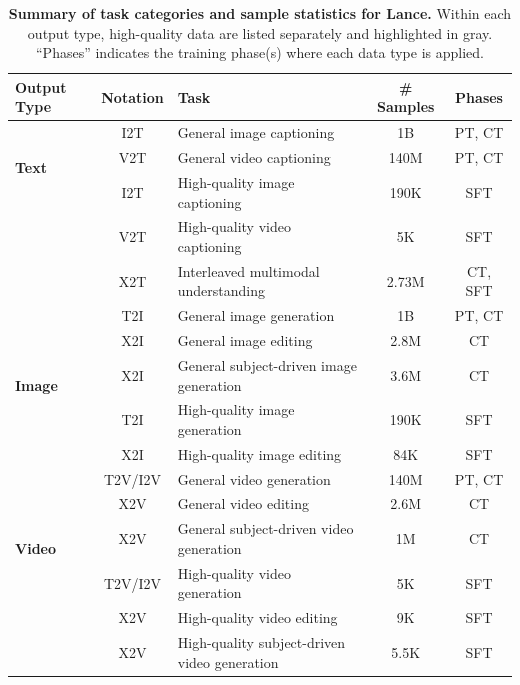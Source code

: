 \begin{table}[t]
\centering
\small
\setlength{\tabcolsep}{5pt}
\renewcommand{\arraystretch}{1.15}
\begin{tabular}{lcp{7.5cm}cc}
\toprule
\textbf{Output Type} & \textbf{Notation} & \textbf{Task} & \textbf{\# Samples} & \textbf{Phases} \\
\midrule

\multirow{3}{*}{\textbf{Text}}
& I2T  & General image captioning                     & 1B    & PT, CT \\
& V2T  & General video captioning                     & 140M  & PT, CT \\
\rowcolor{gray!20}
& I2T  & High-quality image captioning                & 190K  & SFT \\
\rowcolor{gray!20}
& V2T  & High-quality video captioning                & 5K    & SFT \\
\rowcolor{gray!20}
& X2T  & Interleaved multimodal understanding         & 2.73M & CT, SFT \\
\midrule

\multirow{5}{*}{\textbf{Image}}
& T2I  & General image generation                     & 1B    & PT, CT \\
& X2I & General image editing             & 2.8M  & CT \\
& X2I  & General subject-driven image generation          & 3.6M  & CT \\
\rowcolor{gray!20}
& T2I  & High-quality image generation                & 190K  & SFT \\
\rowcolor{gray!20}
& X2I & High-quality image editing                   & 84K   & SFT \\
\midrule

\multirow{5}{*}{\textbf{Video}}
& T2V/I2V  & General video generation                     & 140M  & PT, CT \\
& X2V  & General video editing            & 2.6M  & CT \\
& X2V  & General subject-driven video generation         & 1M    & CT \\
\rowcolor{gray!20}
& T2V/I2V  & High-quality video generation                & 5K    & SFT \\
\rowcolor{gray!20}
& X2V  & High-quality video editing                   & 9K    & SFT \\
\rowcolor{gray!20}
& X2V  & High-quality subject-driven video generation & 5.5K &  SFT \\
\bottomrule
\end{tabular}
\caption{\textbf{Summary of task categories and sample statistics for Lance.}
Within each output type, high-quality data are listed separately and highlighted in gray. ``Phases'' indicates the training phase(s) where each data type is applied. 
}
\label{tab:task_data_summary}
\end{table}

